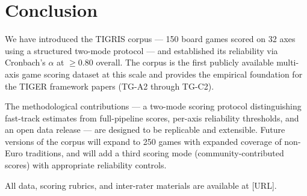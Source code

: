 \section{Conclusion}
\label{sec:conclusion}

We have introduced the TIGRIS corpus --- 150 board games scored on 32 axes using a
structured two-mode protocol --- and established its reliability via Cronbach's $\alpha$
at $\geq 0.80$ overall. The corpus is the first publicly available multi-axis game scoring
dataset at this scale and provides the empirical foundation for the TIGER framework papers
(TG-A2 through TG-C2).

The methodological contributions --- a two-mode scoring protocol distinguishing fast-track
estimates from full-pipeline scores, per-axis reliability thresholds, and an open data
release --- are designed to be replicable and extensible. Future versions of the corpus
will expand to 250 games with expanded coverage of non-Euro traditions, and will add a
third scoring mode (community-contributed scores) with appropriate reliability controls.

All data, scoring rubrics, and inter-rater materials are available at [URL].
